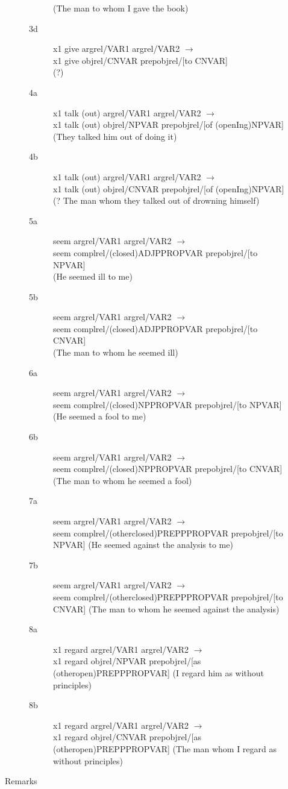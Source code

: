 \begin{description}
\begin{description}
\begin{description}
(The man to whom I gave the book)
  \item[3d] x1 give argrel/VAR1 argrel/VAR2 $\rightarrow$ \\
x1 give    objrel/CNVAR prepobjrel/[to CNVAR] \\
(?)
  \item[4a] x1 talk (out) argrel/VAR1 argrel/VAR2 $\rightarrow$ \\
x1 talk (out)    objrel/NPVAR prepobjrel/[of (openIng)NPVAR] \\
(They talked him out of doing it)
  \item[4b] x1 talk (out) argrel/VAR1 argrel/VAR2 $\rightarrow$ \\
x1 talk (out)    objrel/CNVAR prepobjrel/[of (openIng)NPVAR] \\
(? The man whom they talked out of drowning himself)
  \item[5a] seem argrel/VAR1 argrel/VAR2 $\rightarrow$ \\
seem    complrel/(closed)ADJPPROPVAR prepobjrel/[to NPVAR] \\
(He seemed ill to me)
  \item[5b] seem argrel/VAR1 argrel/VAR2 $\rightarrow$ \\
seem    complrel/(closed)ADJPPROPVAR prepobjrel/[to CNVAR] \\
(The man to whom he seemed ill)
  \item[6a] seem argrel/VAR1 argrel/VAR2 $\rightarrow$ \\
seem    complrel/(closed)NPPROPVAR prepobjrel/[to NPVAR] \\
(He seemed a fool to me)
  \item[6b] seem argrel/VAR1 argrel/VAR2 $\rightarrow$ \\
seem    complrel/(closed)NPPROPVAR prepobjrel/[to CNVAR] \\
(The man to whom he seemed a fool)
  \item[7a] seem argrel/VAR1 argrel/VAR2 $\rightarrow$ \\
seem    complrel/(otherclosed)PREPPPROPVAR prepobjrel/[to NPVAR] 
(He seemed against the analysis to me)
  \item[7b] seem argrel/VAR1 argrel/VAR2 $\rightarrow$ \\
seem    complrel/(otherclosed)PREPPPROPVAR prepobjrel/[to CNVAR] 
(The man to whom he seemed against the analysis)
  \item[8a] x1 regard argrel/VAR1 argrel/VAR2 $\rightarrow$ \\
x1 regard    objrel/NPVAR prepobjrel/[as (otheropen)PREPPPROPVAR]
(I regard him as without principles)
  \item[8b] x1 regard argrel/VAR1 argrel/VAR2 $\rightarrow$ \\
x1 regard    objrel/CNVAR prepobjrel/[as (otheropen)PREPPPROPVAR]
(The man whom I regard as without principles)
  \end{description}
\item[Remarks]
\end{description}


\end{description}
